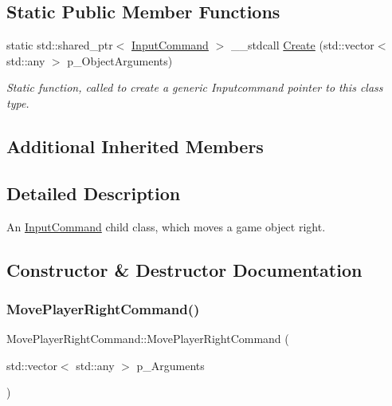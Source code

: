 \subsection*{Static Public Member Functions}
\begin{DoxyCompactItemize}
\item 
static std\+::shared\+\_\+ptr$<$ \mbox{\hyperlink{class_input_command}{Input\+Command}} $>$ \+\_\+\+\_\+stdcall \mbox{\hyperlink{class_move_player_right_command_a7f1db350bd0e0584b1857fb247f80522}{Create}} (std\+::vector$<$ std\+::any $>$ p\+\_\+\+Object\+Arguments)
\begin{DoxyCompactList}\small\item\em Static function, called to create a generic Inputcommand pointer to this class type. \end{DoxyCompactList}\end{DoxyCompactItemize}
\subsection*{Additional Inherited Members}


\subsection{Detailed Description}
An \mbox{\hyperlink{class_input_command}{Input\+Command}} child class, which moves a game object right. 

\subsection{Constructor \& Destructor Documentation}
\mbox{\label{class_move_player_right_command_a9ee41f241e72a1d38f6ab2eeaac240e0}} 
\subsubsection{\texorpdfstring{MovePlayerRightCommand()}{MovePlayerRightCommand()}}
{\footnotesize\ttfamily Move\+Player\+Right\+Command\+::\+Move\+Player\+Right\+Command (\begin{DoxyParamCaption}\item[{std\+::vector$<$ std\+::any $>$}]{p\+\_\+\+Arguments }\end{DoxyParamCaption})\hspace{0.3cm}{\ttfamily [inline]}}



